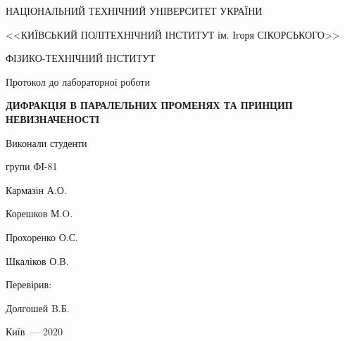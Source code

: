 \thispagestyle{empty}

\begin{center}
НАЦІОНАЛЬНИЙ ТЕХНІЧНИЙ УНІВЕРСИТЕТ УКРАЇНИ \par
<<КИЇВСЬКИЙ ПОЛІТЕХНІЧНИЙ ІНСТИТУТ ім. Ігоря СІКОРСЬКОГО>>\par
ФІЗИКО-ТЕХНІЧНИЙ ІНСТИТУТ\par

\vspace{5cm}
{\huge Протокол до лабораторної роботи \par}

\huge\MakeUppercase{\textbf{ Дифракція в паралельних променях та принцип невизначеності }} \par
\end{center}

\vspace{3cm}
\begin{flushright}
Виконали студенти 

групи ФІ-81

\bigbreak

Кармазін А.О.

Корешков М.O.

Прохоренко О.С.

Шкаліков О.В.

\vspace{20mm}
Перевірив:

Долгошей B.Б.

\end{flushright}

\vspace{4cm}
\begin{center}
{Київ~--- 2020}
\end{center}

\newpage
